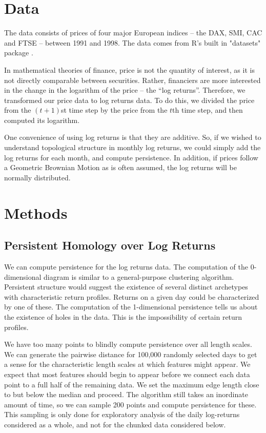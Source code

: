 \documentclass{article}
\begin{document}
\section{Data}
The data consists of prices of four major European indices – the DAX, SMI, CAC and FTSE – between 1991 and 1998. The data comes from R's built in "datasets" package \cite{rprog}.

In mathematical theories of finance, price is not the quantity of interest, as it is not directly comparable between securities. Rather, financiers are more interested in the change in the logarithm of the price – the “log returns”. Therefore, we transformed our price data to log returns data. To do this, we divided the price from the $(t+1)$st time step by the price from the $t$th time step, and then computed its logarithm.

One convenience of using log returns is that they are additive. So, if we wished to understand topological structure in monthly log returns, we could simply add the log returns for each month, and compute persistence. In addition, if prices follow a Geometric Brownian Motion as is often assumed, the log returns will be normally distributed.

\newpage

\section{Methods}

\subsection{Persistent Homology over Log Returns}
We can compute persistence for the log returns data. The computation of the 0-dimensional diagram is similar to a general-purpose clustering algorithm. Persistent structure would suggest the existence of several distinct archetypes with characteristic return profiles. Returns on a given day could be characterized by one of these. The computation of the 1-dimensional persistence tells us about the existence of holes in the data. This is the impossibility of certain return profiles.

We have too many points to blindly compute persistence over all length scales. We can generate the pairwise distance for 100,000 randomly selected days to get a sense for the characteristic length scales at which features might appear. We expect that most features should begin to appear before we connect each data point to a full half of the remaining data. We set the maximum edge length close to but below the median and proceed. The algorithm still takes an inordinate amount of time, so we can sample 200 points and compute persistence for these. This sampling is only done for exploratory analysis of the daily log-returns considered as a whole, and not for the chunked data considered below.
\end{document}
